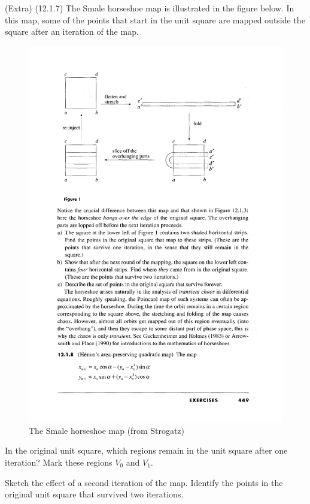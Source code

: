 \documentclass[12pt,letterpaper,noanswers]{exam}
\begin{document}
\eject

\begin{questions}
\item[(Extra)] (12.1.7) The Smale horseshoe map is illustrated in the figure below.  In this map, some of the points that start in the unit square
are mapped outside the square after an iteration of the map.
\begin{figure}[h]
\includegraphics[scale=0.8]{img/C26smale2.pdf}
\caption{The Smale horseshoe map (from Strogatz)}
\end{figure}
\begin{parts}
\item In the original unit square, which regions remain in the unit square after one iteration?  Mark these regions $V_0$ and $V_1$.
\item Sketch the effect of a second iteration of the map.  Identify the points in the original unit square that survived two iterations.

\end{parts}
\end{questions}
\end{document}
